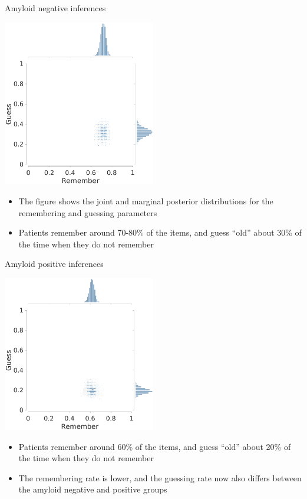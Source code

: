 \documentclass[10pt]{beamer}
\begin{document}
\begin{frame}[fragile]{Amyloid negative inferences}
	\begin{center}
		{\includegraphics[width = 0.5\textwidth, trim = {0cm 0 0cm 0.cm}, clip]{twoHighThreshold_1_betaAmyloidNegative.eps}}
	\end{center}
	\begin{itemize}
		\item The figure shows the joint and marginal posterior distributions for the remembering and guessing parameters
		\item Patients remember around 70-80\% of the items, and guess ``old'' about 30\% of the time when they do not remember
	\end{itemize}
\end{frame}

\begin{frame}[fragile]{Amyloid positive inferences}
	\begin{center}
		\includegraphics[width = 0.5\textwidth, trim = {0cm 0 0cm 1cm}, clip]{twoHighThreshold_1_betaAmyloidPositive.eps}
	\end{center}
	\begin{itemize}
		\item Patients remember around 60\% of the items, and guess ``old'' about 20\% of the time when they do not remember
		\item The remembering rate is lower, and the guessing rate now also differs between the amyloid negative and positive groups
	\end{itemize}
\end{frame}
\end{document}
